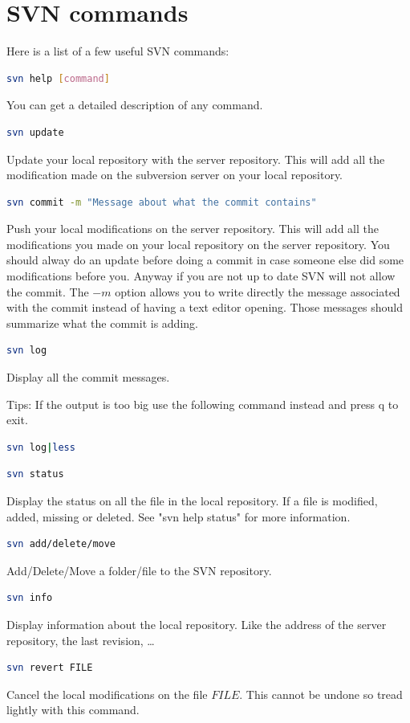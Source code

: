 \section{SVN commands}
%
%
Here is a list of a few useful SVN commands: 
%
\begin{lstlisting}[language=bash]
svn help [command]
\end{lstlisting}
You can get a detailed description of any command.
%
%
\begin{lstlisting}[language=bash]
svn update
\end{lstlisting}
Update your local repository with the server repository. This will add all the
modification made on the subversion server on your local repository.
%
\begin{lstlisting}[language=bash]
svn commit -m "Message about what the commit contains"
\end{lstlisting}
Push your local modifications on the server repository. This will add all the
modifications you made on your local repository on the server repository. You
should alway do an update before doing a commit in case someone else did some
modifications before you. Anyway if you are not up to date SVN will not allow
the commit. The $-m$ option allows you to write directly the message associated
with the commit instead of having a text editor opening. Those messages should
summarize what the commit is adding.
%
\begin{lstlisting}[language=bash]
svn log
\end{lstlisting}
Display all the commit messages.
\\
\begin{CommentBlock}{Tips:}
If the output is too big use the following command instead and press q to exit.
\begin{lstlisting}[language=bash]
svn log|less
\end{lstlisting}
\end{CommentBlock}
%
\begin{lstlisting}[language=bash]
svn status
\end{lstlisting}
Display the status on all the file in the local repository. If a file is
modified, added, missing or deleted. See "svn help status" for more
information.
%
\begin{lstlisting}[language=bash]
svn add/delete/move
\end{lstlisting}
Add/Delete/Move a folder/file to the SVN repository.
%
\begin{lstlisting}[language=bash]
svn info
\end{lstlisting}
Display information about the local repository. Like the address of the server
repository, the last revision, \ldots
%
\begin{lstlisting}[language=bash]
svn revert FILE
\end{lstlisting}
Cancel the local modifications on the file $FILE$. This cannot be undone so
tread lightly with this command.
%

